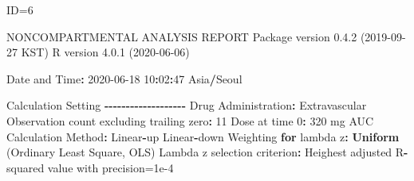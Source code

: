 \documentclass[
  10pt,
]{krantz}
\makeatletter
\newenvironment{Shaded}{\begin{snugshade}}{\end{snugshade}}
\newcommand{\ControlFlowTok}[1]{\textcolor[rgb]{0.13,0.29,0.53}{\textbf{#1}}}
\newcommand{\DecValTok}[1]{\textcolor[rgb]{0.00,0.00,0.81}{#1}}
\newcommand{\FloatTok}[1]{\textcolor[rgb]{0.00,0.00,0.81}{#1}}
\newcommand{\KeywordTok}[1]{\textcolor[rgb]{0.13,0.29,0.53}{\textbf{#1}}}
\newcommand{\NormalTok}[1]{#1}
\newcommand{\OperatorTok}[1]{\textcolor[rgb]{0.81,0.36,0.00}{\textbf{#1}}}
\newcommand{\StringTok}[1]{\textcolor[rgb]{0.31,0.60,0.02}{#1}}
\newenvironment{kframe}{%
\medskip{}
\setlength{\fboxsep}{.8em}
 \def\at@end@of@kframe{}%
 \ifinner\ifhmode%
  \def\at@end@of@kframe{\end{minipage}}%
  \begin{minipage}{\columnwidth}%
 \fi\fi%
 \def\FrameCommand##1{\hskip\@totalleftmargin \hskip-\fboxsep
 \colorbox{shadecolor}{##1}\hskip-\fboxsep
     \hskip-\linewidth \hskip-\@totalleftmargin \hskip\columnwidth}%
 \MakeFramed {\advance\hsize-\width
   \@totalleftmargin\z@ \linewidth\hsize
   \@setminipage}}%
 {\par\unskip\endMakeFramed%
 \at@end@of@kframe}
\renewenvironment{Shaded}{\begin{kframe}}{\end{kframe}}
\makeatother
\begin{document}
\begin{Shaded}
\begin{Highlighting}[]
\NormalTok{ID=}\DecValTok{6}

\NormalTok{                        NONCOMPARTMENTAL ANALYSIS REPORT}
\NormalTok{                       Package version }\DecValTok{0}\NormalTok{.}\FloatTok{4.2}\NormalTok{ (}\DecValTok{2019{-}09{-}27}\NormalTok{ KST)}
\NormalTok{                          R version }\DecValTok{4}\NormalTok{.}\FloatTok{0.1}\NormalTok{ (}\DecValTok{2020{-}06{-}06}\NormalTok{)}

\NormalTok{Date and Time}\OperatorTok{:}\StringTok{ }\DecValTok{2020{-}06{-}18} \DecValTok{10}\OperatorTok{:}\DecValTok{02}\OperatorTok{:}\DecValTok{47}\NormalTok{ Asia}\OperatorTok{/}\NormalTok{Seoul}

\NormalTok{Calculation Setting}
\OperatorTok{{-}{-}{-}{-}{-}{-}{-}{-}{-}{-}{-}{-}{-}{-}{-}{-}{-}{-}{-}}
\NormalTok{Drug Administration}\OperatorTok{:}\StringTok{ }\NormalTok{Extravascular}
\NormalTok{Observation count excluding trailing zero}\OperatorTok{:}\StringTok{ }\DecValTok{11}
\NormalTok{Dose at time }\DecValTok{0}\OperatorTok{:}\StringTok{ }\DecValTok{320}\NormalTok{ mg}
\NormalTok{AUC Calculation Method}\OperatorTok{:}\StringTok{ }\NormalTok{Linear}\OperatorTok{{-}}\NormalTok{up Linear}\OperatorTok{{-}}\NormalTok{down}
\NormalTok{Weighting }\ControlFlowTok{for}\NormalTok{ lambda z}\OperatorTok{:}\StringTok{ }\KeywordTok{Uniform}\NormalTok{ (Ordinary Least Square, OLS)}
\NormalTok{Lambda z selection criterion}\OperatorTok{:}\StringTok{ }\NormalTok{Heighest adjusted R}\OperatorTok{{-}}\NormalTok{squared value with precision=}\FloatTok{1e{-}4}



\end{Highlighting}
\end{Shaded}
\end{document}
